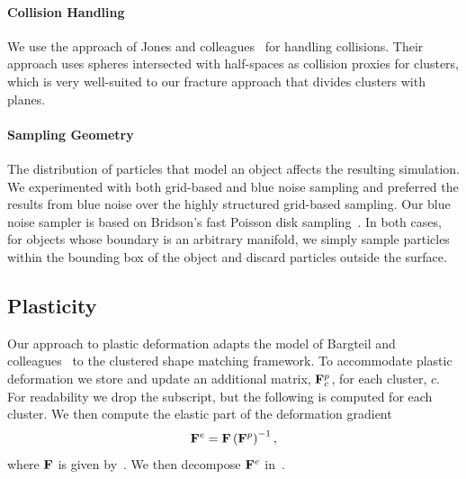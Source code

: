 \documentclass[conference]{acmsiggraph}
\begin{document}
\paragraph{Collision Handling}
We use the approach of Jones and colleagues~ for handling collisions.  Their approach
uses spheres intersected with half-spaces as collision proxies for clusters, which is very well-suited to our
fracture approach that divides clusters with planes.

\paragraph{Sampling Geometry}
The distribution of particles that model an object 
affects the resulting simulation.  We
experimented with both grid-based and blue noise sampling and
preferred the results from blue noise over the highly structured grid-based sampling.
Our blue noise sampler is based on Bridson's fast Poisson disk
sampling~\cite{Bridson:2007:FPD}.  In both cases, for objects whose
boundary is an arbitrary manifold, we simply sample particles within
the bounding box of the object and discard particles outside
the surface.

\subsection{Plasticity}
\label{sec:Plasticity}
Our approach to plastic deformation adapts the model of Bargteil and colleagues~
to the clustered shape matching framework.
To accommodate plastic deformation we store and update an additional matrix, $\mathit{\mathbf{F}}^p_c$, for each cluster, $c$.
For readability we drop the subscript, but the following is computed for each cluster.
We then compute the elastic part of the deformation gradient
\begin{equation}
\mathit{\mathbf{F}}^e = \mathit{\mathbf{F}} \left(\mathit{\mathbf{F}}^p\right)^{-1},
\end{equation}
where $\mathit{\mathbf{F}}$ is given by~.  We then decompose $\mathit{\mathbf{F}}^e$ in~.
\end{document}
